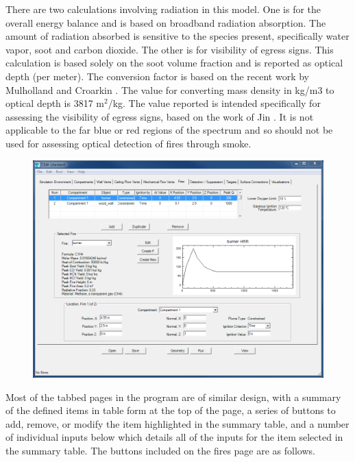There are two calculations involving radiation in this model. One is for the overall energy balance and is based on broadband radiation absorption. The amount of radiation absorbed is sensitive to the species present, specifically water vapor, soot and carbon dioxide. The other is for visibility of egress signs. This calculation is based solely on the soot volume fraction and is reported as optical depth (per meter). The conversion factor is based on the recent work by Mulholland and Croarkin \cite{Mullholland:2000}. The value for converting mass density in kg/m3 to optical depth is 3817 m$^2$/kg. The value reported is intended specifically for assessing the visibility of egress signs, based on the work of Jin \cite{Jin:1979}.  It is not applicable to the far blue or red regions of the spectrum and so should not be used for assessing optical detection of fires through smoke.

\begin{figure}[h!]
\begin{center}
\includegraphics[width=6.5in]{FIGURES/Input_File/Fire_Tab}
\end{center}
\end{figure}

Most of the tabbed pages in the program are of similar design, with a summary of the defined items in table form at the top of the page, a series of buttons to add, remove, or modify the item highlighted in the summary table, and a number of individual inputs below which details all of the inputs for the item selected in the summary table. The buttons included on the fires page are as follows.


